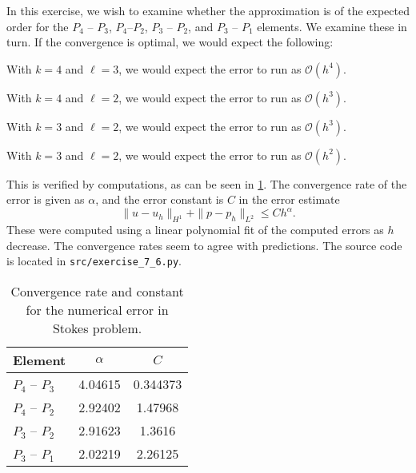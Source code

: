 \documentclass[twocolumn, article]{memoir}
\begin{document}
In this exercise, we wish to examine whether the approximation is of the
expected order for the \(P_4\) -- \(P_3\), \(P_4\)--\(P_2\), \(P_3\) --
\(P_2\), and \(P_3\) -- \(P_1\) elements. We examine these in turn.  If the
convergence is optimal, we would expect the following:
\begin{description}[wide]
    \item[\(P_4\)--\(P_3\):] 
    With \( k = 4 \) and \(\ell = 3\), we would expect the error to run as \(
    \mathcal{O}(h^4) \).

    \item[\(P_4\)--\(P_2\):]
    With \( k = 4 \) and \(\ell = 2\), we would expect the error to run as \(
    \mathcal{O}(h^3) \).

    \item[\(P_3\)--\(P_2\):]
    With \( k = 3 \) and \(\ell = 2\), we would expect the error to run as \(
    \mathcal{O}(h^3) \).

    \item[\(P_3\)--\(P_1\):]
    With \( k = 3 \) and \(\ell = 2\), we would expect the error to run as \(
    \mathcal{O}(h^2) \).
\end{description}
This is verified by computations, as can be seen in
\cref{tab:approximation_order_7_6}. The convergence rate of the error is given as \( \alpha \), and the error constant is \( C \) in the error estimate \[ \| u - u_h\|_{H^1} + \| p - p_h \|_{L^2} \leq Ch^\alpha.\] These were computed using a linear polynomial fit of the computed errors as \( h \) decrease. The convergence rates seem to agree with predictions. The source code is located in
\texttt{src/exercise\_7\_6.py}.

\begin{table}[tpb]
    \centering
    \caption{Convergence rate and constant for the numerical error in Stokes
    problem.}
    \label{tab:approximation_order_7_6}
    \begin{tabular}{lcc}
    \toprule
    {Element} & \( \alpha \) & \(C\) \\
    \midrule
    \(P_4\) -- \(P_3\) &          4.04615 &    0.344373 \\
    \(P_4\) -- \(P_2\) &          2.92402 &     1.47968 \\
    \(P_3\) -- \(P_2\) &          2.91623 &      1.3616 \\
    \(P_3\) -- \(P_1\) &          2.02219 &     2.26125 \\
    \bottomrule
    \end{tabular}
\end{table}
\end{document}
